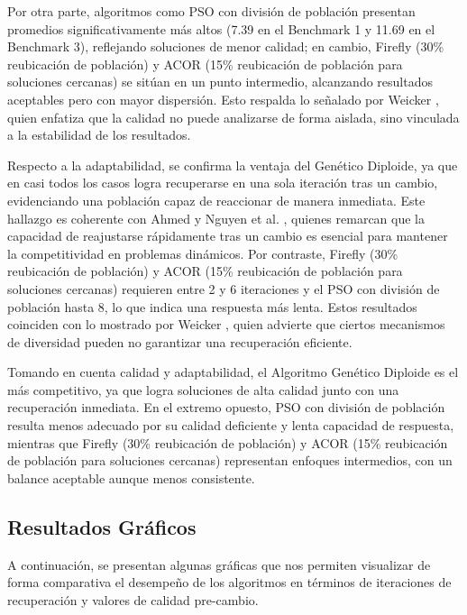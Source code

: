 \documentclass[10pt]{article}
\begin{document}
Por otra parte, algoritmos como PSO con división de población presentan promedios significativamente más altos (7.39 en el Benchmark 1 y 11.69 en el Benchmark 3), reflejando soluciones de menor calidad; en cambio, Firefly (30\% reubicación de población) y ACOR (15\% reubicación de población para soluciones cercanas) se sitúan en un punto intermedio, alcanzando resultados aceptables pero con mayor dispersión. Esto respalda lo señalado por Weicker \cite{weicker1999es}, quien enfatiza que la calidad no puede analizarse de forma aislada, sino vinculada a la estabilidad de los resultados.

Respecto a la adaptabilidad, se confirma la ventaja del Genético Diploide, ya que en casi todos los casos logra recuperarse en una sola iteración tras un cambio, evidenciando una población capaz de reaccionar de manera inmediata. Este hallazgo es coherente con Ahmed \cite{ahmed2024adaptive} y Nguyen et al. \cite{nguyen2013kd}, quienes remarcan que la capacidad de reajustarse rápidamente tras un cambio es esencial para mantener la competitividad en problemas dinámicos. Por contraste, Firefly (30\% reubicación de población) y ACOR (15\% reubicación de población para soluciones cercanas) requieren entre 2 y 6 iteraciones y el PSO con división de población hasta 8, lo que indica una respuesta más lenta. Estos resultados coinciden con lo mostrado por Weicker \cite{weicker1999es}, quien advierte que ciertos mecanismos de diversidad pueden no garantizar una recuperación eficiente.

Tomando en cuenta calidad y adaptabilidad, el Algoritmo Genético Diploide es el más competitivo, ya que logra soluciones de alta calidad junto con una recuperación inmediata. En el extremo opuesto, PSO con división de población resulta menos adecuado por su calidad deficiente y lenta capacidad de respuesta, mientras que Firefly (30\% reubicación de población) y ACOR (15\% reubicación de población para soluciones cercanas) representan enfoques intermedios, con un balance aceptable aunque menos consistente.


\subsection*{Resultados Gráficos}

A continuación, se presentan algunas gráficas que nos permiten visualizar de forma comparativa el desempeño de los algoritmos en términos de iteraciones de recuperación y valores de calidad pre-cambio.
\end{document}

